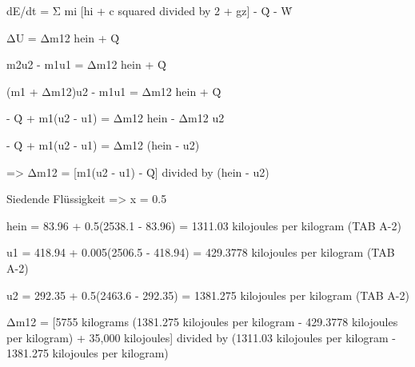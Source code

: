dE/dt = Σ mi [hi + c squared divided by 2 + gz] - Q̇ - Ẇ  

ΔU = Δm12 hein + Q̇  

m2u2 - m1u1 = Δm12 hein + Q̇  

(m1 + Δm12)u2 - m1u1 = Δm12 hein + Q̇  

- Q̇ + m1(u2 - u1) = Δm12 hein - Δm12 u2  

- Q̇ + m1(u2 - u1) = Δm12 (hein - u2)  

=> Δm12 = [m1(u2 - u1) - Q̇] divided by (hein - u2)  

Siedende Flüssigkeit => x = 0.5  

hein = 83.96 + 0.5(2538.1 - 83.96) = 1311.03 kilojoules per kilogram  
(TAB A-2)  

u1 = 418.94 + 0.005(2506.5 - 418.94) = 429.3778 kilojoules per kilogram  
(TAB A-2)  

u2 = 292.35 + 0.5(2463.6 - 292.35) = 1381.275 kilojoules per kilogram  
(TAB A-2)  

Δm12 = [5755 kilograms (1381.275 kilojoules per kilogram - 429.3778 kilojoules per kilogram) + 35,000 kilojoules] divided by (1311.03 kilojoules per kilogram - 1381.275 kilojoules per kilogram)